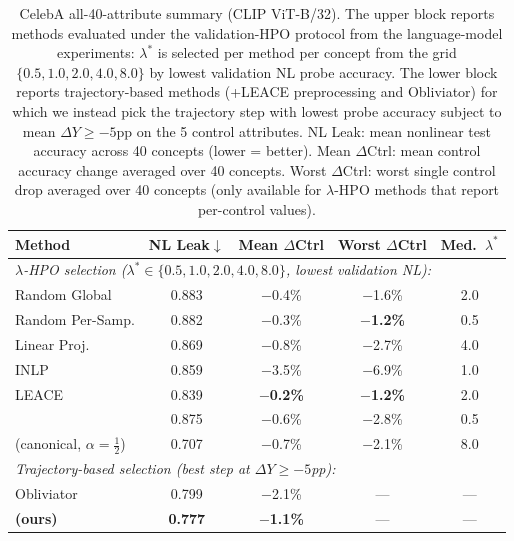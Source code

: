 \begin{table}[t]
\centering
\caption{CelebA all-40-attribute summary (CLIP ViT-B/32). The upper block reports methods evaluated under the validation-HPO protocol from the language-model experiments: $\lambda^*$ is selected per method per concept from the grid $\{0.5, 1.0, 2.0, 4.0, 8.0\}$ by lowest validation NL probe accuracy. The lower block reports trajectory-based methods (\TanGCE{}+LEACE preprocessing and Obliviator) for which we instead pick the trajectory step with lowest probe accuracy subject to mean $\Delta Y \geq -5$pp on the 5 control attributes. NL Leak: mean nonlinear test accuracy across 40 concepts (lower = better). Mean $\Delta$Ctrl: mean control accuracy change averaged over 40 concepts. Worst $\Delta$Ctrl: worst single control drop averaged over 40 concepts (only available for $\lambda$-HPO methods that report per-control values).}
\label{tab:celeba_clip_all40}
\small
\setlength{\tabcolsep}{4pt}
\begin{tabular}{l|cccc}
\toprule
Method & NL Leak$\downarrow$ & Mean $\Delta$Ctrl & Worst $\Delta$Ctrl & Med.\ $\lambda^*$ \\
\midrule
\multicolumn{5}{l}{\emph{$\lambda$-HPO selection ($\lambda^* \in \{0.5,1.0,2.0,4.0,8.0\}$, lowest validation NL):}} \\
Random Global       & 0.883 & $-$0.4\% & $-$1.6\% & 2.0 \\
Random Per-Samp.    & 0.882 & $-$0.3\% & \textbf{$-$1.2\%} & 0.5 \\
Linear Proj.        & 0.869 & $-$0.8\% & $-$2.7\% & 4.0 \\
INLP                & 0.859 & $-$3.5\% & $-$6.9\% & 1.0 \\
LEACE               & 0.839 & \textbf{$-$0.2\%} & \textbf{$-$1.2\%} & 2.0 \\
\AmbGCE{}           & 0.875 & $-$0.6\% & $-$2.8\% & 0.5 \\
\TanGCE{} (canonical, $\alpha = \tfrac{1}{2}$)   & 0.707 & $-$0.7\% & $-$2.1\% & 8.0 \\
\midrule
\multicolumn{5}{l}{\emph{Trajectory-based selection (best step at $\Delta Y \geq -5$pp):}} \\
Obliviator          & 0.799 & $-$2.1\% & --- & --- \\
\textbf{\TanGCEpp{} (ours)} & \textbf{0.777} & \textbf{$-$1.1\%} & --- & --- \\
\bottomrule
\end{tabular}
\end{table}
